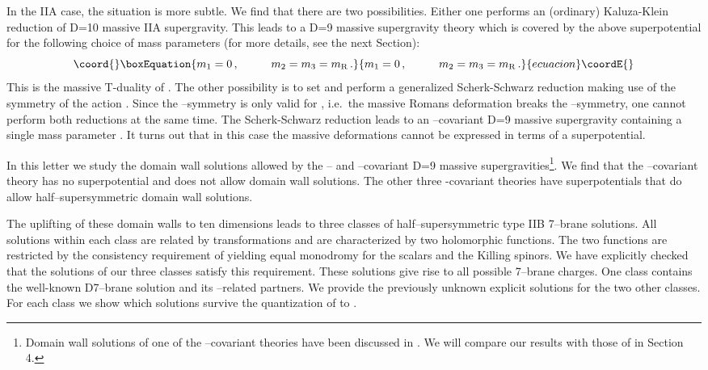 \documentclass[12pt,a4paper]{article}
\def\bb#1{\hbox{\mybb#1}}
\def\bbs#1{\hbox{\mybbs#1}}
\begin{document}
In the IIA case, the situation is more subtle. We find that there are
two possibilities. Either one performs an (ordinary) Kaluza-Klein
reduction of D=10 massive IIA supergravity. This leads to a D=9
massive supergravity theory which is covered by the above superpotential
for the following choice of mass parameters (for more details, see
the next Section):
\begin{equation}\coord{}\boxEquation{
  m_1 = 0\, ,\hskip 1truecm m_2 = m_3 = m_{\rm R} \, .
}{
  m_1 = 0\, ,\hskip 1truecm m_2 = m_3 = m_{\rm R} \, .
}{ecuacion}\coordE{}\end{equation}
This is the massive T-duality of \cite{Bergshoeff:1996ui}.
The other possibility is to  set \coordHE{} and perform a
generalized Scherk-Schwarz reduction making use of the \coordHE{}
symmetry of the action \cite{Lavrinenko:1998qa}. Since the
\coordHE{}--symmetry is only valid for \coordHE{}, i.e.~the
massive Romans deformation breaks the \coordHE{}--symmetry, one
cannot perform both reductions at the same time. The
Scherk-Schwarz reduction leads to an \coordHE{}--covariant
D=9 massive supergravity containing a single mass parameter \coordHE{}.
It turns out that in this case the massive deformations
cannot be expressed in terms of a  superpotential.


In this letter we study the domain wall
solutions allowed by the \myHighlight{$SL(2,\bb{R})$}\coordHE{}-- and \coordHE{}--covariant
D=9 massive supergravities\footnote{Domain wall solutions of one
of the \myHighlight{$SL(2,\bbs{R})$}\coordHE{}--covariant theories have been discussed in
\cite{Cowdall:2000sq}. We will compare our results with those of
\cite{Cowdall:2000sq} in Section 4.}. We find that the
\coordHE{}--covariant theory has no superpotential and does not
allow domain wall solutions. The other three
\myHighlight{$SL(2,\bb{R})$}\coordHE{}-covariant theories have superpotentials that do
allow half--supersymmetric domain wall solutions.


The uplifting of these domain walls to ten dimensions
leads to three classes of half--supersymmetric type IIB 7--brane solutions.
All solutions within each class are related by
\myHighlight{$SL(2,\bb{R})$}\coordHE{} transformations and are characterized by two
holomorphic functions. The two functions are restricted by the
consistency requirement of yielding equal monodromy for the scalars and the Killing
spinors. We have explicitly checked that the solutions of our three classes
satisfy this requirement. These solutions give rise to all possible
 7--brane
charges. One class contains the well-known D7--brane solution and its
\myHighlight{$SL(2,\bb{R})$}\coordHE{}--related partners.  We provide the previously unknown explicit
solutions for the two other classes. For each class we show which
solutions survive the quantization of \myHighlight{$SL(2,\bb{R})$}\coordHE{} to
\myHighlight{$SL(2,\bb{Z})$}\coordHE{}.
\end{document}
